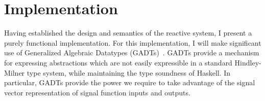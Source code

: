 \chapter{Implementation}
\label{chapter:Implementation}

Having established the design and semantics of the reactive system, I present a purely 
functional implementation. For this implementation, I will make significant use of
Generalized Algebraic Datatypes (GADTs)~\cite{Cheney2003,Xi2003}. GADTs provide a mechanism
for expressing abstractions which are not easily expressible in a standard
Hindley-Milner type system, while maintaining the type soundness of Haskell.
In particular, GADTs provide the power we require to take advantage of the
signal vector representation of signal function inputs and outputs.




